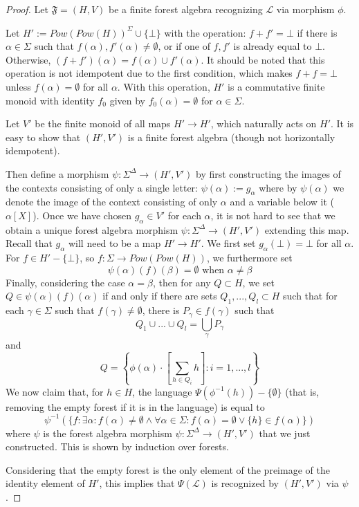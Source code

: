 \documentclass[sigplan,9pt]{acmart}\settopmatter{printfolios=true,printccs=false,printacmref=false}
\theoremstyle{definition}
\newcommand{\La}[0]{{\mathcal{L}}}
\newcommand{\Ff}[0]{{\mathfrak{F}}}
\begin{document}
\begin{proof}
Let $\Ff = (H,V)$ be a finite forest algebra recognizing $\La$ via morphism $\phi$. 


Let $H' := {Pow(Pow(H))}^\Sigma \cup \{\bot\}$ with the operation: $f + f' = \bot$ if there is $\alpha \in \Sigma$ such that $f(\alpha), f'(\alpha) \neq \emptyset$, or if one of $f, f'$ is already equal to $\bot$.
Otherwise, $(f+f')(\alpha) = f(\alpha) \cup f'(\alpha)$.
It should be noted that this operation is not idempotent due to the first condition, which makes $f + f = \bot$ unless $f(\alpha) = \emptyset$ for all $\alpha$.
With this operation, $H'$ is a commutative finite monoid with identity $f_0$ given by $f_0(\alpha) = \emptyset$ for $\alpha \in \Sigma$.

Let $V'$ be the finite monoid of all maps $H' \rightarrow H'$, which naturally acts on $H'$.
It is easy to show that $(H',V')$ is a finite forest algebra (though not horizontally idempotent).

Then define a morphism $\psi : \Sigma^\Delta \rightarrow (H',V')$ by first constructing the images of the contexts consisting of only a single letter: $\psi(\alpha) := g_\alpha$ where by $\psi(\alpha)$ we denote the image of the context consisting of only $\alpha$ and a variable below it ($\alpha[X]$).
Once we have chosen $g_\alpha \in V'$ for each $\alpha$, it is not hard to see that we obtain a unique forest algebra morphism $\psi : \Sigma^\Delta \rightarrow (H',V')$ extending this map.
Recall that $g_\alpha$ will need to be a map $H' \rightarrow H'$.
We first set $g_\alpha(\bot) = \bot$ for all $\alpha$.
For $f \in H' - \{\bot\}$, so $f : \Sigma \rightarrow Pow(Pow(H))$, we furthermore set
\[\psi(\alpha)(f)(\beta) = \emptyset \text{ when }\alpha \neq \beta\]
Finally, considering the case $\alpha = \beta$, then for any $Q \subset H$, we set $Q \in \psi(\alpha)(f)(\alpha)$ if and only if
there are sets $Q_1, ..., Q_l \subset H$ such that for each $\gamma \in \Sigma$ such that $f(\gamma) \neq \emptyset$, there is $P_\gamma \in f(\gamma)$ such that
\[Q_1 \cup ... \cup Q_l = \bigcup_{\gamma} P_\gamma\]
 and 
\[Q = \left\{\phi(\alpha)\cdot\left[\sum_{h \in Q_i} h\right] : i=1, ..., l\right\}\]
%
%
%
We now claim that, for $h \in H$, the language $\Psi(\phi^{-1}(h)) - \{\emptyset\}$ (that is, removing the empty forest if it is in the language) is equal to 
\[\psi^{-1}(\{f : \exists \alpha : f(\alpha) \neq \emptyset \wedge \forall \alpha \in \Sigma : f(\alpha) = \emptyset \vee \{h\} \in f(\alpha)\})\]
where $\psi$ is the forest algebra morphism $\psi : \Sigma^\Delta \rightarrow (H',V')$ that we just constructed.
This is shown by induction over forests.

Considering that the empty forest is the only element of the preimage of the identity element of $H'$, this implies that $\Psi(\La)$ is recognized by $(H',V')$ via $\psi$.
\end{proof}
\end{document}
